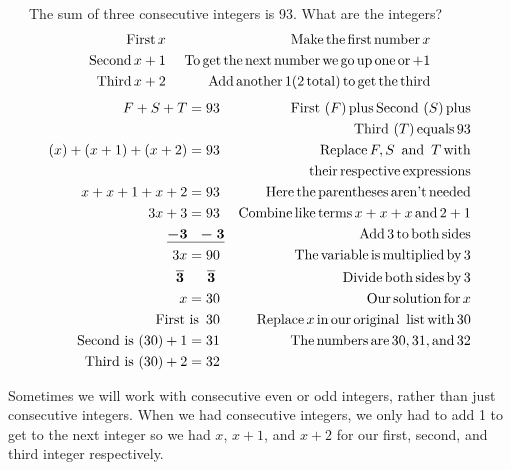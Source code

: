\begin{example}\label{Lin76}~~~The sum of three consecutive integers is 93. What are the integers?
  \begin{eqnarray*}
    \operatorname{First} x~ &  & \operatorname{Make} \operatorname{the} \operatorname{first} \operatorname{number} x\\
    \operatorname{Second} x + 1~ &  & \operatorname{To} \operatorname{get} \operatorname{the} \operatorname{next}
    \operatorname{number} \operatorname{we} \operatorname{go} \operatorname{up} \operatorname{one} \operatorname{or} + 1\\
    \operatorname{Third} x + 2~ &  & \operatorname{Add} \operatorname{another} 1 (2 \operatorname{total})
    \operatorname{to} \operatorname{get} \operatorname{the} \operatorname{third}
  \end{eqnarray*}
  \begin{eqnarray*}
		F + S + T = 93~ &  & \operatorname{First~} (F) \operatorname{plus} \operatorname{Second~} (S)
    \operatorname{plus}\\
		& & ~~~\operatorname{Third~} (T) \operatorname{equals} 93\\
    (x) + (x + 1) + (x + 2) = 93~ &  & \operatorname{Replace} F, S \operatorname{~and~} T \operatorname{with}\\
		& & ~~~\operatorname{their} \operatorname{respective} \operatorname{expressions}\\
  x + x + 1 + x + 2 = 93~&  & \operatorname{Here} \operatorname{the} \operatorname{parentheses}
    \operatorname{aren't} \operatorname{needed}\\
    3 x + 3 = 93~ &  & \operatorname{Combine} \operatorname{like} \operatorname{terms} x + x + x
    \operatorname{and} 2 + 1\\
    \boldsymbol{\underline{- 3 ~~- 3}} &  & \operatorname{Add} 3 \operatorname{to} \operatorname{both}
    \operatorname{sides}\\
    3 x = 90~ &  & \operatorname{The} \operatorname{variable} \operatorname{is} \operatorname{multiplied}
    \operatorname{by} 3\\
    \boldsymbol{\overline{3} ~~~~~ \overline{3}}~~ &  & \operatorname{Divide} \operatorname{both}
    \operatorname{sides} \operatorname{by} 3\\
    x = 30~ &  & \operatorname{Our} \operatorname{solution} \operatorname{for} x\\
    \operatorname{First~is~} 30~ &  & \operatorname{Replace} x \operatorname{in} \operatorname{our}
    \operatorname{original}~ \operatorname{list} \operatorname{with} 30\\
    \operatorname{Second~is~} (30) + 1 = 31~ &  & \operatorname{The} \operatorname{numbers} \operatorname{are} 30,
    31, \operatorname{and} 32\\
    \operatorname{Third~is~} (30) + 2 = 32~ &  & 
  \end{eqnarray*}
\end{example}

 Sometimes we will work with consecutive even or odd integers, rather than just
consecutive integers. When we had consecutive integers, we only had to add 1
to get to the next integer so we had $x$, $x + 1$, and $x + 2$ for our first,
second, and third integer respectively.\pp

